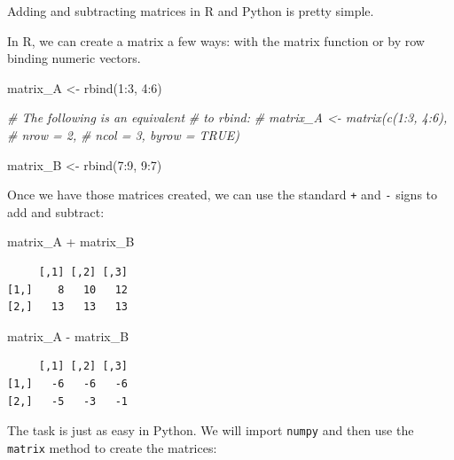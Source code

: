 \documentclass[
  letterpaper,
]{krantz}
\newenvironment{Shaded}{}{}
\newcommand{\CommentTok}[1]{\textcolor[rgb]{0.38,0.63,0.69}{\textit{#1}}}
\newcommand{\DecValTok}[1]{\textcolor[rgb]{0.25,0.63,0.44}{#1}}
\newcommand{\FunctionTok}[1]{\textcolor[rgb]{0.02,0.16,0.49}{#1}}
\newcommand{\NormalTok}[1]{#1}
\newcommand{\OtherTok}[1]{\textcolor[rgb]{0.00,0.44,0.13}{#1}}
\newcommand{\SpecialCharTok}[1]{\textcolor[rgb]{0.25,0.44,0.63}{#1}}
\begin{document}
Adding and subtracting matrices in R and Python is pretty simple.

In R, we can create a matrix a few ways: with the matrix function or by
row binding numeric vectors.

\begin{Shaded}
\begin{Highlighting}[]
\NormalTok{matrix\_A }\OtherTok{\textless{}{-}} \FunctionTok{rbind}\NormalTok{(}\DecValTok{1}\SpecialCharTok{:}\DecValTok{3}\NormalTok{, }
                  \DecValTok{4}\SpecialCharTok{:}\DecValTok{6}\NormalTok{)}

\CommentTok{\# The following is an equivalent}
\CommentTok{\# to rbind:}
\CommentTok{\# matrix\_A \textless{}{-} matrix(c(1:3, 4:6), }
\CommentTok{\#                    nrow = 2, }
\CommentTok{\#                    ncol = 3, byrow = TRUE)}

\NormalTok{matrix\_B }\OtherTok{\textless{}{-}} \FunctionTok{rbind}\NormalTok{(}\DecValTok{7}\SpecialCharTok{:}\DecValTok{9}\NormalTok{, }
                  \DecValTok{9}\SpecialCharTok{:}\DecValTok{7}\NormalTok{)}
\end{Highlighting}
\end{Shaded}

Once we have those matrices created, we can use the standard \texttt{+}
and \texttt{-} signs to add and subtract:

\begin{Shaded}
\begin{Highlighting}[]
\NormalTok{matrix\_A }\SpecialCharTok{+}\NormalTok{ matrix\_B}
\end{Highlighting}
\end{Shaded}

\begin{verbatim}
     [,1] [,2] [,3]
[1,]    8   10   12
[2,]   13   13   13
\end{verbatim}

\begin{Shaded}
\begin{Highlighting}[]
\NormalTok{matrix\_A }\SpecialCharTok{{-}}\NormalTok{ matrix\_B}
\end{Highlighting}
\end{Shaded}

\begin{verbatim}
     [,1] [,2] [,3]
[1,]   -6   -6   -6
[2,]   -5   -3   -1
\end{verbatim}

The task is just as easy in Python. We will import \texttt{numpy} and
then use the \texttt{matrix} method to create the matrices:
\end{document}
